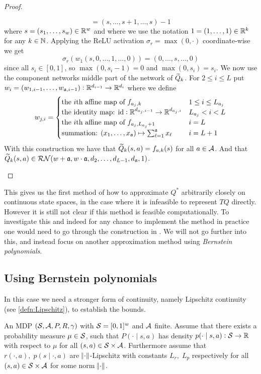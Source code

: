 \begin{proof}[Proof]
\begin{enumerate}[label = \alph*.]
\[    = (s, \dots, s + 1, \dots, s) - 1 \]
    where $s = (s_1, \dots, s_w) \in \mathbb{R}^w$ and where
    we use the notation $1 = (1, \dots, 1) \in \mathbb{R}^k$ for any $k \in \mathbb{N}$.
    Applying the ReLU activation $\sigma_r = \max(0, \cdot)$
    coordinate-wise we get
    \[ \sigma_r(w_1(s, 0, \dots, 1, \dots, 0)) =
    (0, \dots, s, \dots, 0) \]
    since all $s_i \in [0,1]$, so $\max(0, s_i - 1) = 0$ and
    $\max(0, s_i) = s_i$.
    We now use the component networks middle part of the network of $\widetilde{Q}_k$.
    For $2 \leq i \leq L$ put
    $w_i = (w_{1, i-1}, \dots, w_{\frak{a}, i-1}) : \mathbb{R}^{d_{i-1}} \to \mathbb{R}^{d_i}$ 
    where we define
    \[ w_{j, i} = \begin{cases}
	\text{the $i$th affine map of } f_{a_j, k} & 1 \leq i \leq L_{a_j}
	\\ \text{the identity map: } 
	\text{id} : \mathbb{R}^{d_{a_j, i-1}} \to \mathbb{R}^{d_{a_j, i}} & L_{a_j} < i < L
	\\ \text{the $i$th affine map of } f_{a_j, L_{a_j} + 1} & i = L
	\\ \text{summation: } (x_1, \dots, x_\frak{a}) \mapsto
	\sum_{\ell = 1}^\frak{a} x_\ell & i = L + 1
    \end{cases} \]
    With this construction we have that
    $\widetilde{Q}_k(s, a) = f_{a, k}(s)$
    for all $a \in \mathcal{A}$.
    And that $\widetilde{Q}_k(s, a) \in \mathcal{RN}(w + \frak{a}, w\cdot \frak{a}
    , d_2, \dots, d_{L-1}, d_\frak{a}, 1)$.
\end{enumerate}
\end{proof}

This gives us the first method of how to approximate
$Q^*$ arbitrarily closely on continuous state spaces, in the case
where it is infeasible to represent $TQ$ directly.
However it is still not clear if this method is feasible
computationally.
To investigate this and indeed for any chance to implement the method
in practice one would need to go through the
construction in . We will not go further into this,
and instead focus on another approximation method using
\emph{Bernstein polynomials}.

\subsection{Using Bernstein polynomials}

In this case we need a stronger form of continuity, namely
Lipschitz continuity (see \cref{defn:Lipschitz}), to establish the bounds.

\begin{sett}
  An MDP $(\mathcal{S}, \mathcal{A}, P, R, \gamma)$ with
  $\mathcal{S} = [0,1]^w$ and $\mathcal{A}$ finite.
  Assume that there exists a probability measure $\mu \in \mathcal{S}$, such that
  $P(\cdot \mid s, a)$ has density
  $p(\cdot \mid s, a) : \mathcal{S} \to \mathbb{R}$ with respect to
  $\mu$ for all $(s, a) \in \mathcal{S}\times\mathcal{A}$. 
  Furthermore assume that $r(\cdot, a), \; p(s \mid \cdot, a)$ are
  $\norm{\cdot}$-Lipschitz
  with constants $L_r,\; L_p$ respectively for all
  $(s, a) \in \mathcal{S} \times \mathcal{A}$
  for some norm $\norm{\cdot}$.
  \label{sett:polyApprox}
\end{sett}

